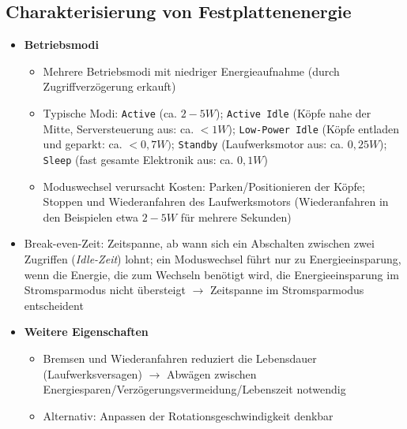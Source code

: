 \subsection{Charakterisierung von Festplattenenergie}
\begin{itemize}
	\item \textbf{Betriebsmodi}
	\begin{itemize}
		\item Mehrere Betriebsmodi mit niedriger Energieaufnahme (durch Zugriffverzögerung erkauft)
		\item Typische Modi: \texttt{Active} (ca. \(2-5W\)); \texttt{Active Idle} (Köpfe nahe der Mitte, Serversteuerung aus: ca. \(<1W\)); \texttt{Low-Power Idle} (Köpfe entladen und geparkt: ca. \(<0,7W)\); \texttt{Standby} (Laufwerksmotor aus: ca. \(0,25W\)); \texttt{Sleep} (fast gesamte Elektronik aus: ca. \(0,1W\))
		\item Moduswechsel verursacht Kosten: Parken/Positionieren der Köpfe; Stoppen und Wiederanfahren des Laufwerksmotors (Wiederanfahren in den Beispielen etwa \(2-5W\) für mehrere Sekunden)
	\end{itemize}
	\item Break-even-Zeit: Zeitspanne, ab wann sich ein Abschalten zwischen zwei Zugriffen (\textit{Idle-Zeit}) lohnt; ein Moduswechsel führt nur zu Energieeinsparung, wenn die Energie, die zum Wechseln benötigt wird, die Energieeinsparung im Stromsparmodus nicht übersteigt \(\rightarrow\) Zeitspanne im Stromsparmodus entscheident
	\item \textbf{Weitere Eigenschaften}
	\begin{itemize}
		\item Bremsen und Wiederanfahren reduziert die Lebensdauer (Laufwerksversagen) \(\rightarrow\) Abwägen zwischen Energiesparen/Verzögerungsvermeidung/Lebenszeit notwendig
		\item Alternativ: Anpassen der Rotationsgeschwindigkeit denkbar
	\end{itemize}
\end{itemize}


